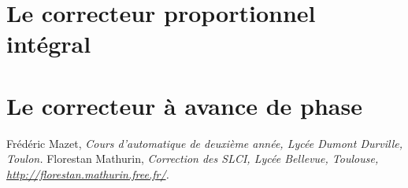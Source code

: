 \documentclass[10pt,fleqn]{article} %
\begin{document}
\section{Le correcteur proportionnel intégral}

\section{Le correcteur à avance de phase}


\begin{thebibliography}{2}
    Frédéric Mazet, {\it Cours d'automatique de deuxième année, Lycée Dumont Durville, Toulon.}
       Florestan Mathurin, {\it Correction des SLCI, Lycée Bellevue, Toulouse, \url{http://florestan.mathurin.free.fr/}.}



\end{thebibliography}
\end{document}
